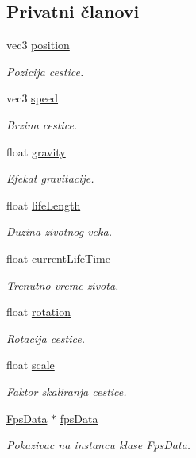 \subsection*{Privatni članovi}
\begin{DoxyCompactItemize}
\item 
vec3 \hyperlink{classparticle_1_1Particle_adbbe15e722e36d8933f228891b6e9d68}{position}
\begin{DoxyCompactList}\small\item\em Pozicija cestice. \end{DoxyCompactList}\item 
vec3 \hyperlink{classparticle_1_1Particle_a24b42fc49ed65250499e0ba059764f0c}{speed}
\begin{DoxyCompactList}\small\item\em Brzina cestice. \end{DoxyCompactList}\item 
float \hyperlink{classparticle_1_1Particle_ae600a9dd750175cc63e19ddc826e7ce2}{gravity}
\begin{DoxyCompactList}\small\item\em Efekat gravitacije. \end{DoxyCompactList}\item 
float \hyperlink{classparticle_1_1Particle_a5489d20fe4168e0fda5b58b3802a9003}{life\+Length}
\begin{DoxyCompactList}\small\item\em Duzina zivotnog veka. \end{DoxyCompactList}\item 
float \hyperlink{classparticle_1_1Particle_a995fbbd73908130f6dc08c5a2107c1d8}{current\+Life\+Time}
\begin{DoxyCompactList}\small\item\em Trenutno vreme zivota. \end{DoxyCompactList}\item 
float \hyperlink{classparticle_1_1Particle_a8ca9da0e74a86eced58a66db613a59a5}{rotation}
\begin{DoxyCompactList}\small\item\em Rotacija cestice. \end{DoxyCompactList}\item 
float \hyperlink{classparticle_1_1Particle_ae33238d14fd210a1d8336e568a456960}{scale}
\begin{DoxyCompactList}\small\item\em Faktor skaliranja cestice. \end{DoxyCompactList}\item 
\hyperlink{classutility_1_1FpsData}{Fps\+Data} $\ast$ \hyperlink{classparticle_1_1Particle_a84e6c4f5fbc007346f27db18dd696045}{fps\+Data}
\begin{DoxyCompactList}\small\item\em Pokazivac na instancu klase Fps\+Data. \end{DoxyCompactList}\end{DoxyCompactItemize}


